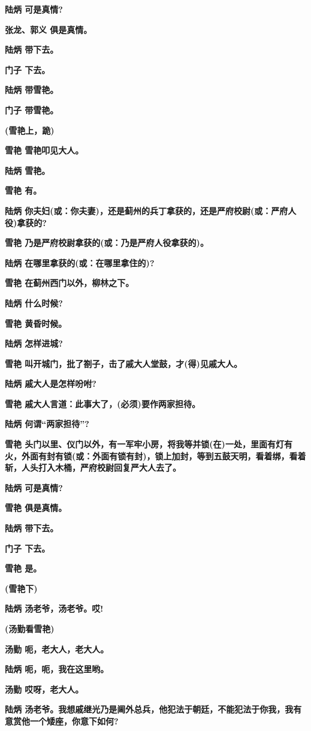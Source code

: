 \textbf{陆炳 可是真情?}

\textbf{张龙、郭义 俱是真情。}

\textbf{陆炳 带下去。}

\textbf{门子 下去。}

\textbf{陆炳 带雪艳。}

\textbf{门子 带雪艳。}

\textbf{(雪艳上，跪)}

\textbf{雪艳 雪艳叩见大人。}

\textbf{陆炳 雪艳。}

\textbf{雪艳 有。}

\textbf{陆炳
你夫妇(或：你夫妻)，还是蓟州的兵丁拿获的，还是严府校尉(或：严府人役)拿获的?}

\textbf{雪艳 乃是严府校尉拿获的(或：乃是严府人役拿获的)。}

\textbf{陆炳 在哪里拿获的(或：在哪里拿住的)?}

\textbf{雪艳 在蓟州西门以外，柳林之下。}

\textbf{陆炳 什么时候?}

\textbf{雪艳 黄昏时候。}

\textbf{陆炳 怎样进城?}

\textbf{雪艳 叫开城门，批了劄子，击了戚大人堂鼓，才(得)见戚大人。}

\textbf{陆炳 戚大人是怎样吩咐?}

\textbf{雪艳 戚大人言道：此事大了，(必须)要作两家担待。}

\textbf{陆炳 何谓``两家担待''?}

\textbf{雪艳
头门以里、仪门以外，有一军牢小房，将我等并锁(在)一处，里面有灯有火，外面有封有锁(或：外面有锁有封)，锁上加封，等到五鼓天明，看着绑，看着斩，人头打入木桶，严府校尉回复严大人去了。}

\textbf{陆炳 可是真情?}

\textbf{雪艳 俱是真情。}

\textbf{陆炳 带下去。}

\textbf{门子 下去。}

\textbf{雪艳 是。}

\textbf{(雪艳下)}

\textbf{陆炳 汤老爷，汤老爷。哎!}

\textbf{(汤勤看雪艳)}

\textbf{汤勤 呃，老大人，老大人。}

\textbf{陆炳 呃，呃，我在这里哟。}

\textbf{汤勤 哎呀，老大人。}

\textbf{陆炳
汤老爷。我想戚继光乃是阃外总兵，他犯法于朝廷，不能犯法于你我，我有意赏他一个矮座，你意下如何?}

